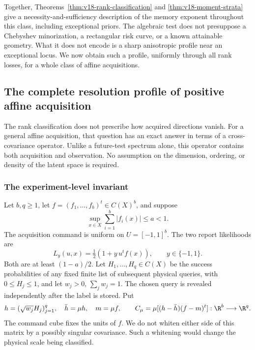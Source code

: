 Together, Theorems~\ref{thm:v18-rank-classification} and
\ref{thm:v18-moment-strata} give a necessity-and-sufficiency description
of the memory exponent throughout this class, including exceptional
priors. The algebraic test does not presuppose a Chebyshev minorization,
a rectangular risk curve, or a known attainable geometry. What it does
not encode is a sharp anisotropic profile near an exceptional locus.
We now obtain such a profile, uniformly through all rank losses, for a
whole class of affine acquisitions.


\subsection{The complete resolution profile of positive affine acquisition}
\label{sec:v18-affine}
The rank classification does not prescribe how acquired directions
vanish. For a general affine acquisition, that question has an exact
answer in terms of a cross-covariance operator. Unlike a future-test
spectrum alone, this operator contains both acquisition and observation.
No assumption on the dimension, ordering, or density of the latent
space is required.

\subsubsection{The experiment-level invariant}
Let $b,q\ge1$, let $f=(f_1,\ldots,f_b)^t\in C(X)^b$, and suppose
\begin{equation}\label{eq:v18-affine-bound}
 \sup_{x\in X}\sum_{i=1}^b|f_i(x)|\le a<1.
\end{equation}
The acquisition command is uniform on $U=[-1,1]^b$. The two report
likelihoods are
\begin{equation}\label{eq:v18-affine-likelihood}
 L_y(u,x)=\tfrac12(1+y\,u^tf(x)),\qquad y\in\{-1,1\}.
\end{equation}
Both are at least $(1-a)/2$. Let $H_1,\ldots,H_q\in C(X)$ be the
success probabilities of any fixed finite list of subsequent physical
queries, with $0\le H_j\le1$, and let $w_j>0$, $\sum_jw_j=1$.
The chosen query is revealed independently after the label is stored.
Put
\begin{equation}\label{eq:v18-covariance}
 h=(\sqrt{w_j}H_j)_{j=1}^q,\quad \bar h=\mu h,\quad m=\mu f,
 \qquad C_\mu=\mu[(h-\bar h)(f-m)^t]:\R^b\longrightarrow\R^q.
\end{equation}
The command cube fixes the units of $f$. We do not whiten either side
of this matrix by a possibly singular covariance. Such a whitening
would change the physical scale being classified.


